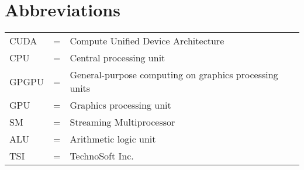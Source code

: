 
\section*{{\Huge Abbreviations}}
\vspace{1 cm}

\noindent
\begin{center}
\begin{tabular}{ l c l }
   CUDA & = & Compute Unified Device Architecture \\
   CPU & = & Central processing unit \\
   GPGPU & = & General-purpose computing on graphics processing units \\
   GPU & = & Graphics processing unit \\
   SM & = & Streaming Multiprocessor \\
   ALU & = & Arithmetic logic unit \\
   TSI & = & TechnoSoft Inc. \\
\end{tabular}
\end{center}

\cleardoublepage

\pagestyle{fancy}
\fancyhf{}
\renewcommand{\chaptermark}[1]{\markboth{\chaptername\ \thechapter.\ #1}{}}
\renewcommand{\sectionmark}[1]{\markright{\thesection\ #1}}
\renewcommand{\headrulewidth}{0.1ex}
\renewcommand{\footrulewidth}{0.1ex}
\fancyfoot[LE,RO]{\thepage}
\fancyhead[LE]{\leftmark}
\fancyhead[RO]{\rightmark}
\fancypagestyle{plain}{\fancyhf{}\fancyfoot[LE,RO]{\thepage}\renewcommand{\headrulewidth}{0ex}}

\setcounter{page}{1}
